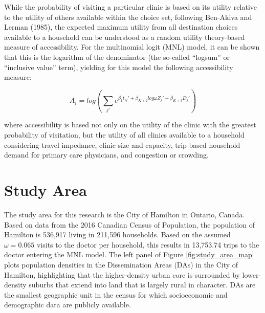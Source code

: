\documentclass[]{elsarticle} %
\begin{document}
While the probability of visiting a particular clinic is based on its
utility relative to the utility of others available within the choice
set, following Ben-Akiva and Lerman (1985), the expected maximum utility
from all destination choices available to a household can be understood
as a random utility theory-based measure of accessibility. For the
multinomial logit (MNL) model, it can be shown that this is the
logarithm of the denominator (the so-called ``logsum'' or ``inclusive
value'' term), yielding for this model the following accessibility
measure:

\[
A_i = log(\sum_{j\prime} e^{\beta_1 t_{ij}\prime + \beta_{K+2} log \omega Z_j\prime + \beta_{K + 3} D_j\prime})
\]

where accessibility is based not only on the utility of the clinic with
the greatest probability of visitation, but the utility of all clinics
available to a household considering travel impedance, clinic size and
capacity, trip-based household demand for primary care physicians, and
congestion or crowding.

\hypertarget{study-area}{%
\section{Study Area}\label{study-area}}

The study area for this research is the City of Hamilton in Ontario,
Canada. Based on data from the 2016 Canadian Census of Population, the
population of Hamilton is 536,917 living in 211,596 households. Based on
the assumed \(\omega = 0.065\) visits to the doctor per household, this
results in 13,753.74 trips to the doctor entering the MNL model. The
left panel of Figure \ref{fig:study_area_map} plots population densities
in the Dissemination Areas (DAs) in the City of Hamilton, highlighting
that the higher-density urban core is surrounded by lower-density
suburbs that extend into land that is largely rural in character. DAs
are the smallest geographic unit in the census for which socioeconomic
and demographic data are publicly available.
\end{document}
